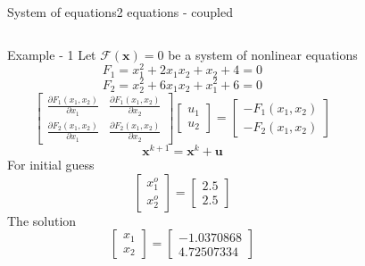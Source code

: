 \documentclass{beamer}
\begin{document}
\begin{frame}{System of equations}{2 equations - coupled}
    \vspace{-2em}
    \begin{columns}[t]
        \begin{block}{\footnotesize Example - 1}
            \scriptsize
            Let $\mathcal{F}(\textbf{x})=0$ be a system of nonlinear equations
            \[F_1 = x_1^{2}+2x_1x_2+x_2+4=0\]
            \vspace{-2em}
            \[F_2 = x_2^{2}+6x_1x_2+x_1^{2}+6=0\]
            \[
                \begin{bmatrix}
                    \frac{\partial F_1(x_1,x_2)}{\partial x_1} & \frac{\partial F_1(x_1,x_2)}{\partial x_2} \\
                    \frac{\partial F_2(x_1,x_2)}{\partial x_1} & \frac{\partial F_2(x_1,x_2)}{\partial x_2}
                \end{bmatrix}
                \begin{bmatrix}
                    u_1 \\ u_2
                \end{bmatrix}
                =
                \begin{bmatrix}
                    -F_1(x_1,x_2) \\
                    -F_2(x_1,x_2) 
                \end{bmatrix}
            \]
            \[\textbf{x}^{k+1}=\textbf{x}^k+\textbf{u}\]
            For initial guess
            \vspace{-1em}
            \[
                \begin{bmatrix}
                    x_1^o \\ x_2^o
                \end{bmatrix}
                =
                \begin{bmatrix}
                    2.5 \\ 2.5
                \end{bmatrix}
            \]
            The solution
            \vspace{-1em}
            \[
                \begin{bmatrix}
                    x_1 \\ x_2
                \end{bmatrix}
                =
                \begin{bmatrix}
                    -1.0370868 \\ 4.72507334

\end{bmatrix}\]
\end{block}
\end{columns}
\end{frame}
\end{document}

